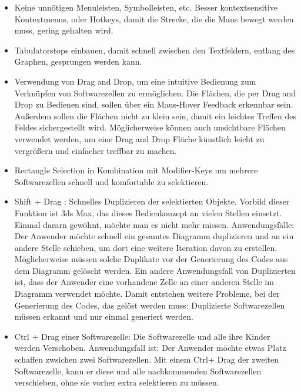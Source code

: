 \documentclass[11pt]{article}
\begin{document}
\begin{itemize}
\item Keine unnötigen Menuleisten, Symbolleisten, etc. Besser kontextsensitive
Kontextmenus, oder Hotkeys,  damit die Strecke, die die Maus bewegt werden muss, gering
gehalten wird.
\item Tabulatorstops einbauen, damit schnell zwischen den Textfeldern, entlang des
Graphen, gesprungen werden kann.
\item Verwendung von Drag and Drop, um eine intuitive Bedienung zum Verknüpfen von
Softwarezellen zu ermöglichen. Die Flächen, die per Drag and Drop zu Bedienen
sind, sollen über ein Maus-Hover Feedback erkennbar sein. Außerdem sollen die
Flächen nicht zu klein sein, damit ein leichtes Treffen des Feldes
sichergestellt wird. Möglicherweise können auch unsichtbare Flächen verwendet
werden, um eine Drag and Drop Fläche künstlich leicht zu vergrößern und einfacher treffbar zu machen.
\item Rectangle Selection in Kombination mit Modifier-Keys um mehrere Softwarezellen
schnell und komfortable zu selektieren.
\item Shift + Drag : Schnelles Duplizieren der selektierten Objekte. Vorbild dieser
Funktion ist 3ds Max, das dieses Bedienkonzept an vielen Stellen einsetzt.
Einmal dararn gewöhnt, möchte man es nicht mehr missen. Anwendungsfälle:
Der Anwender möchte  schnell ein gesamtes Diagramm duplizieren und an ein andere Stelle schieben, um
dort eine weitere Iteration davon zu erstellen. Möglicherweise müssen solche
Duplikate vor der Generierung des Codes aus dem Diagramm gelöscht werden.
Ein andere Anwendungsfall von Duplizierten ist, dass der Anwender eine vorhandene
Zelle an einer anderen Stelle im Diagramm verwendet möchte. Damit
entstehen weitere Probleme, bei der Generierung des Codes, das gelöst werden
muss: Duplizierte Softwarezellen müssen erkannt und nur einmal generiert werden.
\item Ctrl + Drag einer Softwarezelle: Die Softwarezelle und alle ihre Kinder werden
Verschoben. Anwendungsfall ist: Der Anwender möchte etwas Platz schaffen
zwsichen zwei Softwarezellen. Mit einem Ctrl+ Drag der zweiten Softwarezelle,
kann er diese und alle nachkommenden Softwarezellen verschieben, ohne sie
vorher extra selektieren zu müssen.
\end{itemize}
\end{document}

